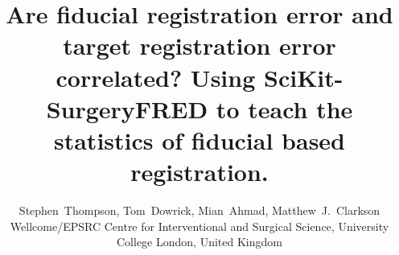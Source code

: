 \documentclass[a4paper, lmargin=1.925cm, rmargin=1.925cm,tmargin=2.54cm,bmargin=4.94cm]{spie}
\begin{document}
%
%
%
%
\title{Are fiducial registration error and target registration error correlated? Using SciKit-SurgeryFRED to teach the statistics of fiducial based registration.}
%
%
\author{Stephen~Thompson, Tom~Dowrick, Mian~Ahmad, Matthew~J.~Clarkson
\skiplinehalf
{}Wellcome/EPSRC Centre for Interventional and Surgical Science, University College London, United Kingdom \\
}

%
%
%


\maketitle              %

\begin{abstract}

\end{abstract}






%



\end{document}
